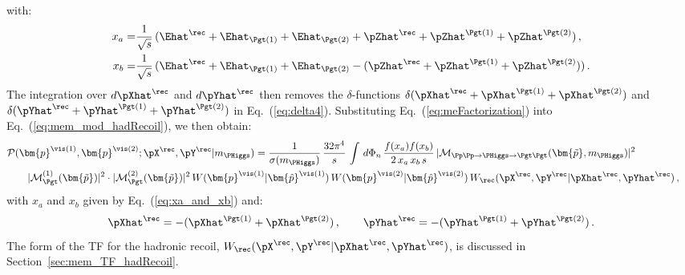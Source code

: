 with:
\begin{align}
x_{a} = & \frac{1}{\sqrt{s}} \, (\Ehat^{\rec} + \Ehat_{\Pgt(1)} +
\Ehat_{\Pgt(2)} + \pZhat^{\rec} + \pZhat^{\Pgt(1)} + \pZhat^{\Pgt(2)})
\, , \nonumber \\
x_{b} = & \frac{1}{\sqrt{s}} \, (\Ehat^{\rec} + \Ehat_{\Pgt(1)} + \Ehat_{\Pgt(2)} - (\pZhat^{\rec} + \pZhat^{\Pgt(1)} + \pZhat^{\Pgt(2)})) \, .
\label{eq:xa_and_xb}
\end{align}
The integration over $d\pXhat^{\rec}$ and $d\pYhat^{\rec}$ then removes the $\delta$-functions 
$\delta( \pXhat^{\rec} + \pXhat^{\Pgt(1)} + \pXhat^{\Pgt(2)} )$ and
$\delta( \pYhat^{\rec} + \pYhat^{\Pgt(1)} + \pYhat^{\Pgt(2)} )$ in Eq.~(\ref{eq:delta4}).
Substituting Eq.~(\ref{eq:meFactorization}) into Eq.~(\ref{eq:mem_mod_hadRecoil}), we then obtain:
\begin{align}
&
\mathcal{P}(\bm{p}^{\vis(1)},\bm{p}^{\vis(2)};\pX^{\rec},\pY^{\rec}|m_{\PHiggs})
= \frac{1}{\sigma(m_{\PHiggs})} \, \frac{32\pi^{4}}{s} \, \int \,
 d\Phi_{n} \, \frac{f(x_{a}) f(x_{b})}{2 \, x_{a} \, x_{b} \, s} \, 
 \vert \mathcal{M}_{\Pp\Pp \to \PHiggs \to \Pgt\Pgt}(\bm{\tilde{p}},m_{\PHiggs}) \vert^{2} \, \hspace{2cm} \nonumber \\
& \qquad \vert \mathcal{M}^{(1)}_{\Pgt}(\bm{\tilde{p}}) \vert^{2} 
 \cdot \vert \mathcal{M}^{(2)}_{\Pgt}(\bm{\tilde{p}}) \vert^{2} \, 
 W(\bm{p}^{\vis(1)}|\bm{\hat{p}}^{\vis(1)}) \, W(\bm{p}^{\vis(2)}|\bm{\hat{p}}^{\vis(2)}) \, W_{\rec}( \pX^{\rec},\pY^{\rec} | \pXhat^{\rec},\pYhat^{\rec} ) \, ,
\label{eq:mem_with_hadRecoil}
\end{align}
with $x_{a}$ and $x_{b}$ given by Eq.~(\ref{eq:xa_and_xb}) and:
\begin{equation}
\pXhat^{\rec} = -(\pXhat^{\Pgt(1)} + \pXhat^{\Pgt(2)}) \, ,
\qquad \pYhat^{\rec} = -(\pYhat^{\Pgt(1)} + \pYhat^{\Pgt(2)}) \, .
\label{eq:xpXhat_and_pYhat}
\end{equation}
The form of the TF for the hadronic recoil, $W_{\rec}( \pX^{\rec},\pY^{\rec} | \pXhat^{\rec},\pYhat^{\rec} )$, is
discussed in Section~\ref{sec:mem_TF_hadRecoil}.

